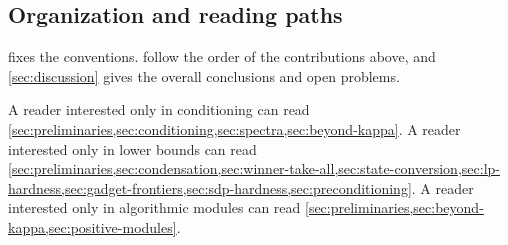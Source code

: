 \subsection{Organization and reading paths}
\label{sec:introduction-organization}

 fixes the conventions.
follow the order of the contributions above, and \cref{sec:discussion}
gives the overall conclusions and open problems.

A reader interested only in conditioning can read
\cref{sec:preliminaries,sec:conditioning,sec:spectra,sec:beyond-kappa}.  A
reader interested only in lower bounds can read
\cref{sec:preliminaries,sec:condensation,sec:winner-take-all,sec:state-conversion,sec:lp-hardness,sec:gadget-frontiers,sec:sdp-hardness,sec:preconditioning}.
A reader interested only in algorithmic modules can read
\cref{sec:preliminaries,sec:beyond-kappa,sec:positive-modules}.
